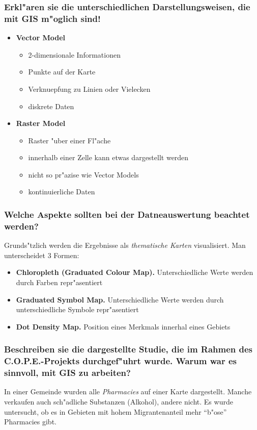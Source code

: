 \subsubsection{Erkl"aren sie die unterschiedlichen Darstellungsweisen, die mit GIS m"oglich sind!}
\begin{itemize}
        \item \textbf{Vector Model}
                \begin{itemize}
                        \item 2-dimensionale Informationen 
                        \item Punkte auf der Karte
                        \item Verknuepfung zu Linien oder Vielecken
                        \item diskrete Daten
                \end{itemize}
        \item \textbf{Raster Model}
                \begin{itemize}
                        \item Raster "uber einer Fl"ache 
                        \item innerhalb einer Zelle kann etwas dargestellt werden
                        \item nicht so pr"azise wie Vector Models
                        \item kontinuierliche Daten
                \end{itemize}
\end{itemize}

\subsubsection{Welche Aspekte sollten bei der Datneauswertung beachtet werden?}
Grunds"tzlich werden die Ergebnisse als \emph{thematische Karten} visualisiert. Man unterscheidet 3 Formen:
\begin{itemize}
        \item \textbf{Chloropleth (Graduated Colour Map).} Unterschiedliche Werte werden durch Farben repr"asentiert
        \item \textbf{Graduated Symbol Map.} Unterschiedliche Werte werden durch unterschiedliche Symbole repr"asentiert
        \item \textbf{Dot Density Map.} Position eines Merkmals innerhal eines Gebiets 
\end{itemize}

\subsubsection{Beschreiben sie die dargestellte Studie, die im Rahmen des C.O.P.E.-Projekts durchgef"uhrt wurde. Warum war es sinnvoll, mit GIS zu arbeiten?}
In einer Gemeinde wurden alle \emph{Pharmacies} auf einer Karte dargestellt. Manche verkaufen auch sch"adliche Substanzen (Alkohol), andere nicht. Es wurde untersucht, ob es in Gebieten mit hohem Migrantenanteil mehr ``b"ose'' Pharmacies gibt. 

